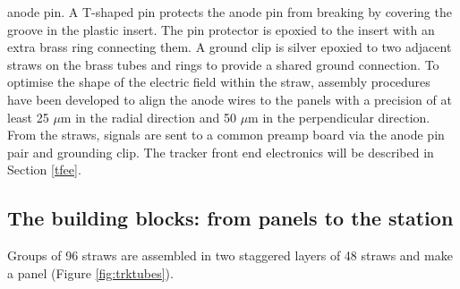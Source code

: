         anode pin. A T-shaped pin protects the anode pin from 
        breaking by covering the groove in the plastic insert. 
        The pin protector is epoxied to the insert with an extra 
        brass ring connecting them. A ground clip is silver epoxied 
        to two adjacent straws on the brass tubes and rings to 
        provide a shared ground connection.
        To optimise the shape of the electric field within 
        the straw, assembly procedures have been developed 
        to align the anode wires to the panels with a 
        precision of at least 25 $\mu$m in the radial direction and 50 $\mu$m in the perpendicular direction. 
From the straws, signals are sent to a common preamp board 
via the anode pin pair and grounding clip. The tracker front 
end electronics will be described in Section \ref{tfee}.
\subsection{The building blocks: from panels to the station}
Groups of 96 straws are assembled in two staggered layers of 48 straws and make a 
panel (Figure \ref{fig:trktubes}). 
